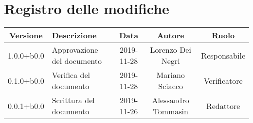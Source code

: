 \section*{Registro delle modifiche}

\begin{center}
	\begin{longtable}{|c|p{3cm}|c|c|c|}
	\hline
	\rowcolor{lighter-grayer}
	\textbf{Versione} & \textbf{Descrizione} & \textbf{Data} & \textbf{Autore} & \textbf{Ruolo} \\
	\hline
	\endfirsthead


	1.0.0+b0.0 & Approvazione del documento & 2019-11-28 & Lorenzo Dei Negri & Responsabile \\
	\hline
	0.1.0+b0.0 & Verifica del documento & 2019-11-28 & Mariano Sciacco & Verificatore \\
	\hline
	0.0.1+b0.0 & Scrittura del documento & 2019-11-26 & Alessandro Tommasin & Redattore \\
	\hline

	\end{longtable}
\end{center}